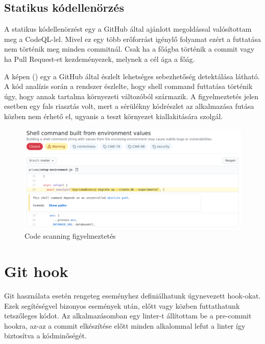 \subsection{Statikus kódellenörzés}
A statikus kódellenörzést egy a GitHub által ajánlott megoldással valósítottam meg a CodeQL-lel.
Mivel ez egy több erőforrást igénylő folyamat ezért a futtatása nem történik meg minden commitnál.
Csak ha a főágba történik a commit vagy ha Pull Request-et kezdeményezek, melynek a cél ága a főág.

A képen () egy a GitHub által észlelt lehetséges sebezhetőség detektálása látható.
A kód analízis során a rendszer észlelte, hogy shell command futtatása történik úgy, hogy annak tartalma környezeti változóból származik.
A figyelmeztetés jelen esetben egy fals riasztás volt, mert a sérülékny kódrészlet az alkalmazása futása közben nem érhető el, ugyanis a teszt környezet kiallakitására szolgál.

\begin{figure}[!ht]
  \centering
  \includegraphics[width=150mm, keepaspectratio]{figures/security.png}
  \caption{Code scanning figyelmeztetés}
  \label{fig:securityCheck}
\end{figure}

\section{Git hook}
Git használata esetén rengeteg eseményhez definiálhatunk úgynevezett hook-okat.
Ezek segítéségvel bizonyos események után, előtt vagy közben futtathatunk tetszőleges kódot.
Az alkalmazásomban egy linter-t állítottam be a pre-commit hookra, az-az a commit elkészítése előtt minden alkalommal lefut a linter így biztosítva a kódminőségét.

